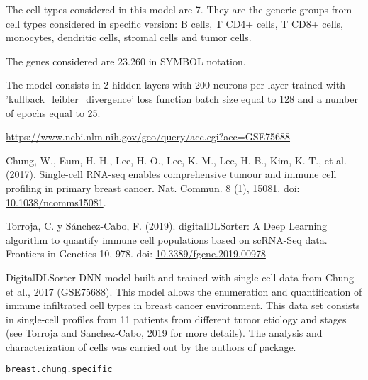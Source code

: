 \documentclass[a4paper]{book}
\begin{document}
%
\begin{Details}\relax
The cell types considered in this model are 7. They are the generic groups
from cell types considered in specific version: B cells, T CD4+ cells, T CD8+
cells, monocytes, dendritic cells, stromal cells and tumor cells.

The genes considered are 23.260 in SYMBOL notation.

The model consists in 2 hidden layers with 200 neurons per layer trained with
'kullback\_leibler\_divergence' loss function  batch size equal to 128 and a
number of epochs equal to 25.
\end{Details}
%
\begin{Source}\relax
\url{https://www.ncbi.nlm.nih.gov/geo/query/acc.cgi?acc=GSE75688}
\end{Source}
%
\begin{References}\relax
Chung, W., Eum, H. H., Lee, H. O., Lee, K. M., Lee, H. B., Kim,
K. T., et al. (2017). Single-cell RNA-seq enables comprehensive tumour and
immune cell profiling in primary breast cancer. Nat. Commun. 8 (1), 15081.
doi: \url{10.1038/ncomms15081}.

Torroja, C. y Sánchez-Cabo, F. (2019). digitalDLSorter: A Deep Learning
algorithm to quantify immune cell populations based on scRNA-Seq data.
Frontiers in Genetics 10, 978. doi: \url{10.3389/fgene.2019.00978}
\end{References}
%
\begin{Description}\relax
DigitalDLSorter DNN model built and trained with single-cell data from Chung
et al., 2017 (GSE75688). This model allows the enumeration and quantification
of immune infiltrated cell types in breast cancer environment. This data set
consists in single-cell profiles from 11 patients from different tumor
etiology and stages (see Torroja and Sanchez-Cabo, 2019 for more details).
The analysis and characterization of cells was carried out by the authors of
 package.
\end{Description}
%
\begin{Usage}
\begin{verbatim}
breast.chung.specific
\end{verbatim}
\end{Usage}
%
\end{document}
